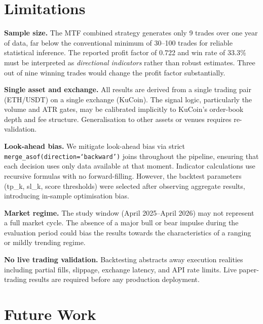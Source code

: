 \documentclass[conference]{IEEEtran}
\begin{document}
\section{Limitations}
\label{sec:limitations}

\textbf{Sample size.} The MTF combined strategy generates
only 9 trades over one year of data, far below the
conventional minimum of 30--100 trades for reliable
statistical inference. The reported profit factor of 0.722
and win rate of 33.3\% must be interpreted as
\emph{directional indicators} rather than robust estimates.
Three out of nine winning trades would change the profit
factor substantially.

\textbf{Single asset and exchange.} All results are derived
from a single trading pair (ETH/USDT) on a single exchange
(KuCoin). The signal logic, particularly the volume and ATR
gates, may be calibrated implicitly to KuCoin's order-book
depth and fee structure. Generalisation to other assets or
venues requires re-validation.

\textbf{Look-ahead bias.} We mitigate look-ahead bias via
strict \texttt{merge\_asof(direction=`backward')} joins
throughout the pipeline, ensuring that each decision uses
only data available at that moment. Indicator calculations
use recursive formulas with no forward-filling. However, the
backtest parameters (tp\_k, sl\_k, score thresholds) were
selected after observing aggregate results, introducing
in-sample optimisation bias.

\textbf{Market regime.} The study window (April 2025--April
2026) may not represent a full market cycle. The absence
of a major bull or bear impulse during the evaluation period
could bias the results towards the characteristics of a
ranging or mildly trending regime.

\textbf{No live trading validation.} Backtesting abstracts
away execution realities including partial fills, slippage,
exchange latency, and API rate limits. Live paper-trading
results are required before any production deployment.


\section{Future Work}
\label{sec:future}
\end{document}
